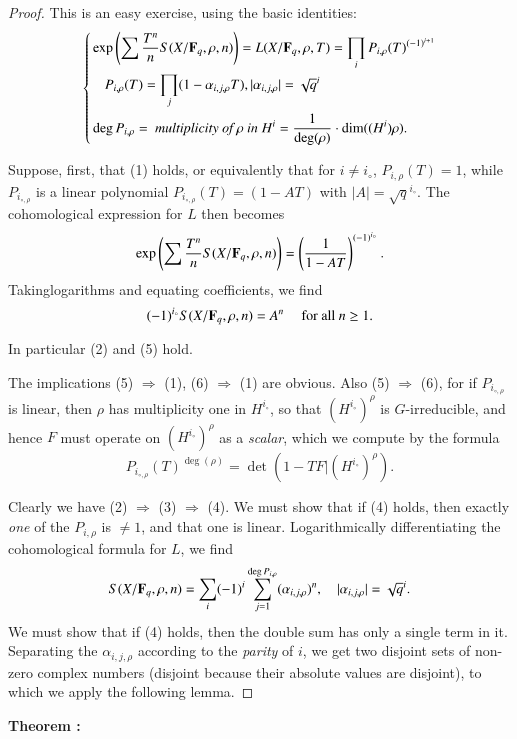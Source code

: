 \begin{proof}
This is an easy exercise, using the basic identities:
$$
\left\{
\begin{aligned}
&\exp \left(\sum \frac{T^n}{n}  S (X / \mathbf{F}_q, \rho, n)\right) = L (X/ \mathbf{F}_q, \rho, T) = \prod\limits_{i} P_{i,\rho} (T)^{(-1)^{i+1}}\\
& \quad P_{i,\rho} (T) = \prod\limits_j (1 - \alpha_{i,j,\rho} T), |\alpha_{i,j,\rho}| = \sqrt{q}^i\\
& \deg P_{i,\rho} = \textit{ multiplicity of $\rho$ in } H^i = \frac{1}{\deg (\rho)} \cdot \dim ((H^i)\rho).
\end{aligned}
\right.
$$

Suppose, first, that (1) holds, or equivalently that for $i \neq i_\circ$, $P_{i,\rho} (T) =1$, while $P_{i_{\circ, \rho}}$ is a linear polynomial $P_{i_{\circ,\rho}} (T) = (1-A T)$ with $|A| = \sqrt{q}^{i_\circ}$. The cohomological expression for $L$ then becomes 
$$
\exp \left(\sum \frac{T^n}{n} S (X/ \mathbf{F}_q, \rho, n) \right) = \left(\frac{1}{1-AT} \right)^{(-1)^{i_\circ}}.
$$
Taking\pageoriginale logarithms and equating coefficients, we find 
$$
(-1)^{i_\circ} S (X/ \mathbf{F}_q, \rho, n) = A^n \quad \text{ for all } n \geq 1. 
$$
 
In particular (2) and (5) hold.

The implications (5) $\Rightarrow$ (1), (6) $\Rightarrow$ (1) are obvious. Also (5) $\Rightarrow$ (6), for if $P_{i_{\circ, \rho}}$ is linear, then $\rho$ has multiplicity one in $H^{i_\circ}$, so that $(H^{i_\circ})^\rho$ is $G$-irreducible, and hence $F$ must operate on $(H^{i_\circ})^\rho$ as a \textit{scalar}, which we compute by the formula
$$
P_{i_{\circ, \rho}} (T)^{\deg (\rho)} = \det (1 - TF \big| (H^{i_\circ})^\rho).
$$

Clearly we have (2) $\Rightarrow$ (3) $\Rightarrow$ (4). We must show that if (4) holds, then exactly \textit{one} of the $P_{i,\rho}$ is $\neq 1$, and that one is linear. Logarithmically differentiating the cohomological formula for $L$, we find 
$$
S(X/ \mathbf{F}_q, \rho, n) = \sum\limits_i (-1)^i \sum\limits^{\deg P_{i, \rho}}_{j=1} (\alpha_{i, j, \rho})^n, \quad |\alpha_{i,j,\rho}| = \sqrt{q}^i.
$$
We must show that if (4) holds, then the double sum has only a single term in it. Separating the $\alpha_{i, j, \rho}$ according to the \textit{parity} of $i$, we get two disjoint sets of non-zero complex numbers (disjoint because their absolute values are disjoint), to which we apply the following lemma.


\end{proof}





\medskip
\noindent
{\bfseries Theorem :\label{art11-thm1}}
